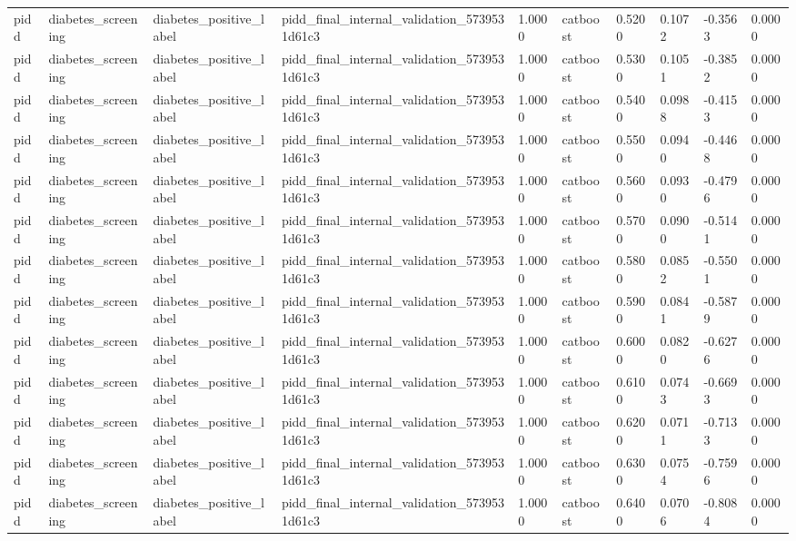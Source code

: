 \begin{tabular}{llllllllll}
pidd & diabetes\_screening & diabetes\_positive\_label & pidd\_final\_internal\_validation\_5739531d61c3 & 1.0000 & catboost & 0.5200 & 0.1072 & -0.3563 & 0.0000 \\
pidd & diabetes\_screening & diabetes\_positive\_label & pidd\_final\_internal\_validation\_5739531d61c3 & 1.0000 & catboost & 0.5300 & 0.1051 & -0.3852 & 0.0000 \\
pidd & diabetes\_screening & diabetes\_positive\_label & pidd\_final\_internal\_validation\_5739531d61c3 & 1.0000 & catboost & 0.5400 & 0.0988 & -0.4153 & 0.0000 \\
pidd & diabetes\_screening & diabetes\_positive\_label & pidd\_final\_internal\_validation\_5739531d61c3 & 1.0000 & catboost & 0.5500 & 0.0940 & -0.4468 & 0.0000 \\
pidd & diabetes\_screening & diabetes\_positive\_label & pidd\_final\_internal\_validation\_5739531d61c3 & 1.0000 & catboost & 0.5600 & 0.0930 & -0.4796 & 0.0000 \\
pidd & diabetes\_screening & diabetes\_positive\_label & pidd\_final\_internal\_validation\_5739531d61c3 & 1.0000 & catboost & 0.5700 & 0.0900 & -0.5141 & 0.0000 \\
pidd & diabetes\_screening & diabetes\_positive\_label & pidd\_final\_internal\_validation\_5739531d61c3 & 1.0000 & catboost & 0.5800 & 0.0852 & -0.5501 & 0.0000 \\
pidd & diabetes\_screening & diabetes\_positive\_label & pidd\_final\_internal\_validation\_5739531d61c3 & 1.0000 & catboost & 0.5900 & 0.0841 & -0.5879 & 0.0000 \\
pidd & diabetes\_screening & diabetes\_positive\_label & pidd\_final\_internal\_validation\_5739531d61c3 & 1.0000 & catboost & 0.6000 & 0.0820 & -0.6276 & 0.0000 \\
pidd & diabetes\_screening & diabetes\_positive\_label & pidd\_final\_internal\_validation\_5739531d61c3 & 1.0000 & catboost & 0.6100 & 0.0743 & -0.6693 & 0.0000 \\
pidd & diabetes\_screening & diabetes\_positive\_label & pidd\_final\_internal\_validation\_5739531d61c3 & 1.0000 & catboost & 0.6200 & 0.0711 & -0.7133 & 0.0000 \\
pidd & diabetes\_screening & diabetes\_positive\_label & pidd\_final\_internal\_validation\_5739531d61c3 & 1.0000 & catboost & 0.6300 & 0.0754 & -0.7596 & 0.0000 \\
pidd & diabetes\_screening & diabetes\_positive\_label & pidd\_final\_internal\_validation\_5739531d61c3 & 1.0000 & catboost & 0.6400 & 0.0706 & -0.8084 & 0.0000 \\

\end{tabular}
